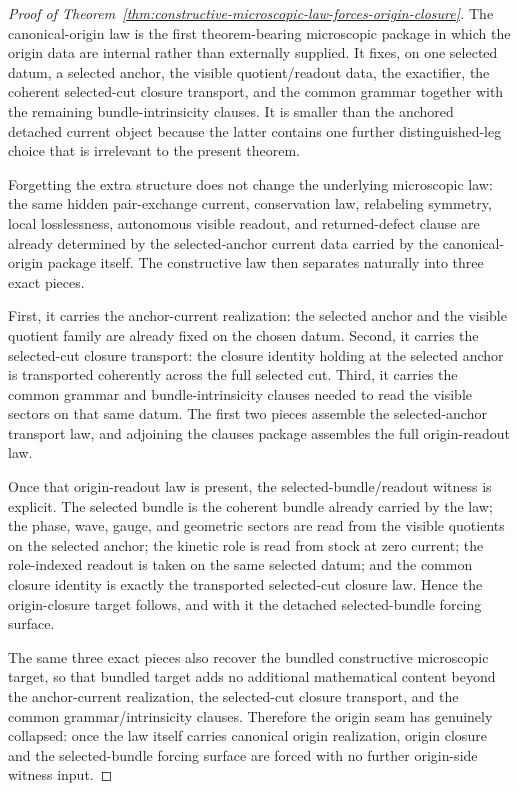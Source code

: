 \begin{proof}[Proof of Theorem~\ref{thm:constructive-microscopic-law-forces-origin-closure}]
\label{proof:thm:constructive-microscopic-law-forces-origin-closure}
The canonical-origin law is the first theorem-bearing microscopic package in
which the origin data are internal rather than externally supplied. It fixes,
on one selected datum, a selected anchor, the visible quotient/readout data,
the exactifier, the coherent selected-cut closure transport, and the common
grammar together with the remaining bundle-intrinsicity clauses. It is smaller
than the anchored detached current object because the latter contains one
further distinguished-leg choice that is irrelevant to the present theorem.

Forgetting the extra structure does not change the underlying microscopic law:
the same hidden pair-exchange current, conservation law, relabeling symmetry,
local losslessness, autonomous visible readout, and returned-defect clause are
already determined by the selected-anchor current data carried by the
canonical-origin package itself. The constructive law then separates naturally
into three exact pieces.

First, it carries the anchor-current realization: the selected anchor and the
visible quotient family are already fixed on the chosen datum. Second, it
carries the selected-cut closure transport: the closure identity holding at
the selected anchor is transported coherently across the full selected cut.
Third, it carries the common grammar and bundle-intrinsicity clauses needed to
read the visible sectors on that same datum. The first two pieces assemble the
selected-anchor transport law, and adjoining the clauses package assembles the
full origin-readout law.

Once that origin-readout law is present, the selected-bundle/readout witness is
explicit. The selected bundle is the coherent bundle already carried by the
law; the phase, wave, gauge, and geometric sectors are read from the visible
quotients on the selected anchor; the kinetic role is read from stock at zero
current; the role-indexed readout is taken on the same selected datum; and the
common closure identity is exactly the transported selected-cut closure law.
Hence the origin-closure target follows, and with it the detached
selected-bundle forcing surface.

The same three exact pieces also recover the bundled constructive microscopic
target, so that bundled target adds no additional mathematical content beyond
the anchor-current realization, the selected-cut closure transport, and the
common grammar/intrinsicity clauses. Therefore the origin seam has genuinely
collapsed: once the law itself carries canonical origin realization, origin
closure and the selected-bundle forcing surface are forced with no further
origin-side witness input.
\end{proof}


